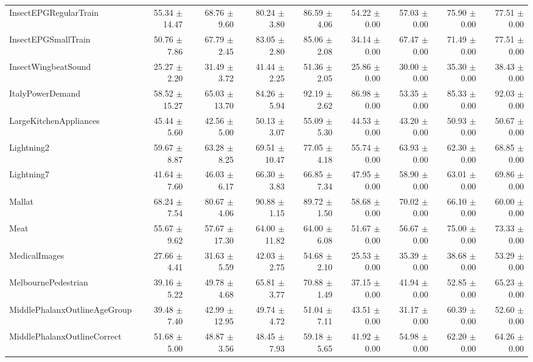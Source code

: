 \begin{landscape}
\begin{longtable}{lrrrrrrrr}
InsectEPGRegularTrain & 55.34 $\pm$ 14.47 & 68.76 $\pm$ 9.60 & 80.24 $\pm$ 3.80 & 86.59 $\pm$ 4.06 & 54.22 $\pm$ 0.00 & 57.03 $\pm$ 0.00 & 75.90 $\pm$ 0.00 & 77.51 $\pm$ 0.00 \\
InsectEPGSmallTrain & 50.76 $\pm$ 7.86 & 67.79 $\pm$ 2.45 & 83.05 $\pm$ 2.80 & 85.06 $\pm$ 2.08 & 34.14 $\pm$ 0.00 & 67.47 $\pm$ 0.00 & 71.49 $\pm$ 0.00 & 77.51 $\pm$ 0.00 \\
InsectWingbeatSound & 25.27 $\pm$ 2.20 & 31.49 $\pm$ 3.72 & 41.44 $\pm$ 2.25 & 51.36 $\pm$ 2.05 & 25.86 $\pm$ 0.00 & 30.00 $\pm$ 0.00 & 35.30 $\pm$ 0.00 & 38.43 $\pm$ 0.00 \\
ItalyPowerDemand & 58.52 $\pm$ 15.27 & 65.03 $\pm$ 13.70 & 84.26 $\pm$ 5.94 & 92.19 $\pm$ 2.62 & 86.98 $\pm$ 0.00 & 53.35 $\pm$ 0.00 & 85.33 $\pm$ 0.00 & 92.03 $\pm$ 0.00 \\
LargeKitchenAppliances & 45.44 $\pm$ 5.60 & 42.56 $\pm$ 5.00 & 50.13 $\pm$ 3.07 & 55.09 $\pm$ 5.30 & 44.53 $\pm$ 0.00 & 43.20 $\pm$ 0.00 & 50.93 $\pm$ 0.00 & 50.67 $\pm$ 0.00 \\
Lightning2 & 59.67 $\pm$ 8.87 & 63.28 $\pm$ 8.25 & 69.51 $\pm$ 10.47 & 77.05 $\pm$ 4.18 & 55.74 $\pm$ 0.00 & 63.93 $\pm$ 0.00 & 62.30 $\pm$ 0.00 & 68.85 $\pm$ 0.00 \\
Lightning7 & 41.64 $\pm$ 7.60 & 46.03 $\pm$ 6.17 & 66.30 $\pm$ 3.83 & 66.85 $\pm$ 7.34 & 47.95 $\pm$ 0.00 & 58.90 $\pm$ 0.00 & 63.01 $\pm$ 0.00 & 69.86 $\pm$ 0.00 \\
Mallat & 68.24 $\pm$ 7.54 & 80.67 $\pm$ 4.06 & 90.88 $\pm$ 1.15 & 89.72 $\pm$ 1.50 & 58.68 $\pm$ 0.00 & 70.02 $\pm$ 0.00 & 66.10 $\pm$ 0.00 & 60.00 $\pm$ 0.00 \\
Meat & 55.67 $\pm$ 9.62 & 57.67 $\pm$ 17.30 & 64.00 $\pm$ 11.82 & 64.00 $\pm$ 6.08 & 51.67 $\pm$ 0.00 & 56.67 $\pm$ 0.00 & 75.00 $\pm$ 0.00 & 73.33 $\pm$ 0.00 \\
MedicalImages & 27.66 $\pm$ 4.41 & 31.63 $\pm$ 5.59 & 42.03 $\pm$ 2.75 & 54.68 $\pm$ 2.10 & 25.53 $\pm$ 0.00 & 35.39 $\pm$ 0.00 & 38.68 $\pm$ 0.00 & 53.29 $\pm$ 0.00 \\
MelbournePedestrian & 39.16 $\pm$ 5.22 & 49.78 $\pm$ 4.68 & 65.81 $\pm$ 3.77 & 70.88 $\pm$ 1.49 & 37.15 $\pm$ 0.00 & 41.94 $\pm$ 0.00 & 52.85 $\pm$ 0.00 & 65.23 $\pm$ 0.00 \\
MiddlePhalanxOutlineAgeGroup & 39.48 $\pm$ 7.40 & 42.99 $\pm$ 12.95 & 49.74 $\pm$ 4.72 & 51.04 $\pm$ 7.11 & 43.51 $\pm$ 0.00 & 31.17 $\pm$ 0.00 & 60.39 $\pm$ 0.00 & 52.60 $\pm$ 0.00 \\
MiddlePhalanxOutlineCorrect & 51.68 $\pm$ 5.00 & 48.87 $\pm$ 3.56 & 48.45 $\pm$ 7.93 & 59.18 $\pm$ 5.65 & 41.92 $\pm$ 0.00 & 54.98 $\pm$ 0.00 & 62.20 $\pm$ 0.00 & 64.26 $\pm$ 0.00 \\

\end{longtable}
\end{landscape}
